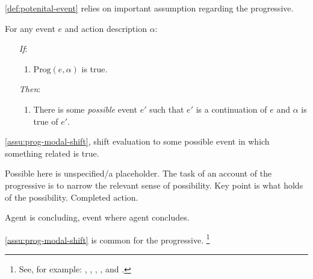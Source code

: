 \begin{note}
  \autoref{def:potenital-event} relies on important assumption regarding the progressive.

  \begin{assumption}
    \label{assu:prog-modal-shift}
    For any event \(e\) and action description \(\alpha\):
    \begin{enumerate}
    \item[\emph{If}:]
      \begin{enumerate}[label=\alph*., ref=(\alph*)]
      \item
        \(\text{Prog}(e, \alpha)\) is true.
      \end{enumerate}
    \item[\emph{Then}:]
      \begin{enumerate}[label=\alph*., ref=(\alph*), resume]
      \item
        There is some \emph{possible} event \(e'\) such that \(e'\) is a continuation of \(e\) and \(\alpha\) is true of \(e'\).
      \end{enumerate}
    \end{enumerate}
    \vspace{-\baselineskip}
  \end{assumption}

  \autoref{assu:prog-modal-shift}, shift evaluation to some possible event in which something related is true.

  Possible here is unspecified/a placeholder.
  The task of an account of the progressive is to narrow the relevant sense of possibility.
  Key point is what holds of the possibility.
  Completed action.

  Agent is concluding, event where agent concludes.

  \autoref{assu:prog-modal-shift} is common for the progressive.%
  \footnote{
    See, for example:
    \textcite{Bennett:1972uw},
    \textcite{Dowty:1979vq},
    \textcite{Parsons:1990aa},
    \textcite{Landman:1992wh}, and
    \textcite{Portner:1998um}.

}
\end{note}
